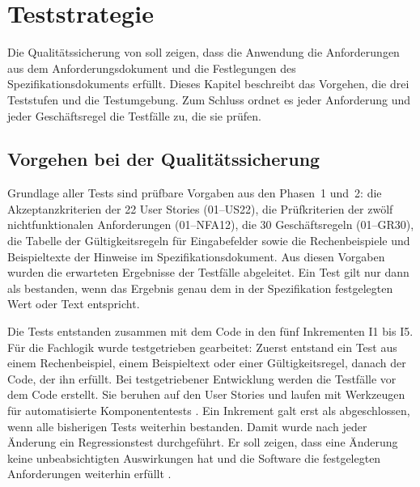 \section{Teststrategie}\label{sec:teststrategie}
Die Qualitätssicherung von \Projektname{} soll zeigen, dass die Anwendung die Anforderungen aus dem Anforderungsdokument und die Festlegungen des Spezifikationsdokuments erfüllt. Dieses Kapitel beschreibt das Vorgehen, die drei Teststufen und die Testumgebung. Zum Schluss ordnet es jeder Anforderung und jeder Geschäftsregel die Testfälle zu, die sie prüfen.

\subsection{Vorgehen bei der Qualitätssicherung}\label{sec:vorgehen}
Grundlage aller Tests sind prüfbare Vorgaben aus den Phasen~1 und~2: die Akzeptanzkriterien der 22 User Stories (01--US22), die Prüfkriterien der zwölf nichtfunktionalen Anforderungen (01--NFA12), die 30 Geschäftsregeln (01--GR30), die Tabelle der Gültigkeitsregeln für Eingabefelder sowie die Rechenbeispiele und Beispieltexte der Hinweise im Spezifikationsdokument. Aus diesen Vorgaben wurden die erwarteten Ergebnisse der Testfälle abgeleitet. Ein Test gilt nur dann als bestanden, wenn das Ergebnis genau dem in der Spezifikation festgelegten Wert oder Text entspricht.

Die Tests entstanden zusammen mit dem Code in den fünf Inkrementen I1 bis I5. Für die Fachlogik wurde testgetrieben gearbeitet: Zuerst entstand ein Test aus einem Rechenbeispiel, einem Beispieltext oder einer Gültigkeitsregel, danach der Code, der ihn erfüllt. Bei testgetriebener Entwicklung werden die Testfälle vor dem Code erstellt. Sie beruhen auf den User Stories und laufen mit Werkzeugen für automatisierte Komponententests \parencite[S.~5-24]{swebok2026}. Ein Inkrement galt erst als abgeschlossen, wenn alle bisherigen Tests weiterhin bestanden. Damit wurde nach jeder Änderung ein Regressionstest durchgeführt. Er soll zeigen, dass eine Änderung keine unbeabsichtigten Auswirkungen hat und die Software die festgelegten Anforderungen weiterhin erfüllt \parencite[S.~5-8]{swebok2026}.

